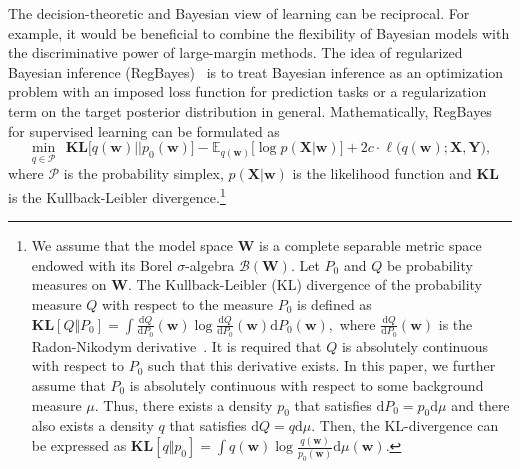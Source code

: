 \documentclass[twoside,11pt]{article}
\newcommand{\Xv}{\bm{X}}
\newcommand{\Yv}{\bm{Y}}
\newcommand{\wv}{\bm{w}}
\newcommand{\Wv}{\bm{W}}
\newcommand{\loss}{\ell}
\newcommand{\ud}{\mathrm{d}}
\newcommand{\ep}{\mathbb{E}}
\newcommand{\KL}{\textbf{KL}}
\begin{document}
The decision-theoretic and Bayesian view of learning can be reciprocal. For example, it would be beneficial to combine the flexibility of Bayesian models with the discriminative power of large-margin methods. The idea of regularized Bayesian inference (RegBayes)~\citep{zhu2013bayesian} is to treat Bayesian inference as an optimization problem with an imposed loss function for prediction tasks or a regularization term on the target posterior distribution in general. Mathematically, RegBayes for supervised learning can be formulated as
\begin{equation}\label{eq:regBayes}
\min\limits_{q \in \mathcal{P}}~~ \KL\Big[q(\wv)||p_0(\wv)\Big] - \ep_{q(\wv)} \Big[ \log p(\Xv | \wv) \Big] + 2c \cdot \loss\Big(q(\wv); \Xv, \Yv \Big),
\end{equation}
where $\mathcal{P}$ is the probability simplex, $p(\Xv | \wv)$ is the likelihood function and $\KL$ is the Kullback-Leibler divergence.\footnote{We assume that the model space $\Wv$ is a complete separable metric space endowed with its Borel $\sigma$-algebra $\mathcal{B}(\Wv)$. Let $P_0$ and $Q$ be probability measures on $\Wv$. The Kullback-Leibler (KL) divergence of the probability measure $Q$ with respect to the measure $P_0$ is defined as $\KL[ Q \Vert P_0] = \int \frac{\ud Q}{\ud P_0}(\wv) \log \frac{\ud Q}{\ud P_0}(\wv) \ud P_0(\wv),$ where $\frac{\ud Q}{\ud P_0}(\wv)$ is the Radon-Nikodym derivative~\citep{durret2010}. It is required that $Q$ is absolutely continuous with respect to $P_0$ such that this derivative exists. In this paper, we further assume that $P_0$ is absolutely continuous with respect to some background measure $\mu$. Thus, there exists a density $p_0$ that satisfies $\ud P_0 = p_0 \ud \mu$ and there also exists a density $q$ that satisfies $\ud Q = q \ud \mu$. Then, the KL-divergence can be expressed as $\KL[ q \Vert p_0 ] = \int q(\wv) \log \frac{q(\wv)}{p_0(\wv)} \ud \mu(\wv)$.}
\end{document}
